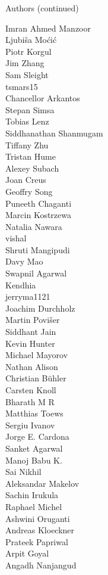 \begin{frame}{Authors (continued)}
\begin{multicols}{5}
Imran Ahmed Manzoor\\
Ljubiša Moćić\\
Piotr Korgul\\
Jim Zhang\\
Sam Sleight\\
tsmars15\\
Chancellor Arkantos\\
Stepan Simsa\\
Tobias Lenz\\
Siddhanathan Shanmugam\\
Tiffany Zhu\\
Tristan Hume\\
Alexey Subach\\
Joan Creus\\
Geoffry Song\\
Puneeth Chaganti\\
Marcin Kostrzewa\\
Natalia Nawara\\
vishal\\
Shruti Mangipudi\\
Davy Mao\\
Swapnil Agarwal\\
Kendhia\\
jerryma1121\\
Joachim Durchholz\\
Martin Povišer\\
Siddhant Jain\\
Kevin Hunter\\
Michael Mayorov\\
Nathan Alison\\
Christian Bühler\\
Carsten Knoll\\
Bharath M R\\
Matthias Toews\\
Sergiu Ivanov\\
Jorge E. Cardona\\
Sanket Agarwal\\
Manoj Babu K.\\
Sai Nikhil\\
Aleksandar Makelov\\
Sachin Irukula\\
Raphael Michel\\
Ashwini Oruganti\\
Andreas Kloeckner\\
Prateek Papriwal\\
Arpit Goyal\\
Angadh Nanjangud\\

\end{multicols}
\end{frame}
